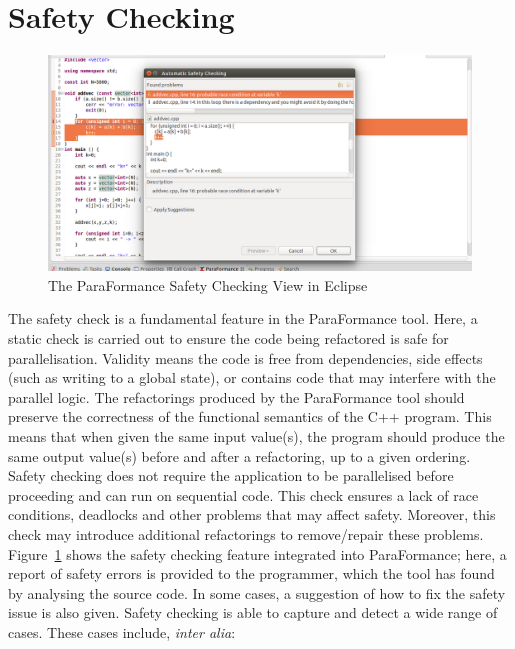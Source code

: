 \section{Safety Checking}
\begin{figure}
\centering
\includegraphics[scale=0.26]{figures/pf-safety-auto-dialog.png}
\caption{The ParaFormance Safety Checking View in Eclipse}
\label{fig:safety1}
\end{figure}

The safety check is a fundamental feature in the ParaFormance tool. Here, a static check is carried out to ensure the code being refactored is safe for parallelisation. Validity means the code is free from dependencies, side effects (such as writing to a global state), or contains code that may interfere with the parallel logic.
%
The refactorings produced by the ParaFormance tool should preserve the correctness of the functional semantics of the C++ program. This means that when given the same input value(s), the program should produce the same output value(s) before and after a refactoring, up to a given ordering.
%
Safety checking does not require the application to be parallelised before proceeding and can run on sequential code. This check ensures a lack of race conditions, deadlocks and other problems that may affect safety. Moreover, this check may introduce additional refactorings to remove/repair these problems. 
%
Figure~\ref{fig:safety1} shows the safety checking feature integrated into ParaFormance; here, a report of safety errors is provided to the programmer, which the tool has found by analysing the source code.
In some cases, a suggestion of how to fix the safety issue is also given. Safety checking is able to capture and detect a wide range of cases. These cases include, \textit{inter alia}:

